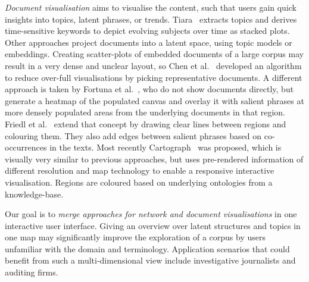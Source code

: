 \textit{Document visualisation} aims to visualise the content, such that users gain quick insights into topics, latent phrases, or trends.
Tiara~\cite{wei2010tiara} extracts topics and derives time-sensitive keywords to depict evolving subjects over time as stacked plots.
Other approaches project documents into a latent space, using topic models or embeddings.
Creating scatter-plots of embedded documents of a large corpus may result in a very dense and unclear layout, so Chen et al.~\cite{chen2009exemplar} developed an algorithm to reduce over-full visualisations by picking representative documents.
A different approach is taken by Fortuna et al.~\cite{fortuna2005visualization}, who do not show documents directly, but generate a heatmap of the populated canvas and overlay it with salient phrases at more densely populated areas from the underlying documents in that region.
Friedl et al.~\cite{fried2014maps} extend that concept by drawing clear lines between regions and colouring them.
They also add edges between salient phrases based on co-occurrences in the texts.
Most recently Cartograph~\cite{sen2017cartograph} was proposed, which is visually very similar to previous approaches, but uses pre-rendered information of different resolution and map technology to enable a responsive interactive visualisation.
Regions are coloured based on underlying ontologies from a knowledge-base.

Our goal is to \textit{merge approaches for network and document visualisations} in one interactive user interface.
Giving an overview over latent structures and topics in one map may significantly improve the exploration of a corpus by users unfamiliar with the domain and terminology.
Application scenarios that could benefit from such a multi-dimensional view include investigative journalists and auditing firms.


% 


